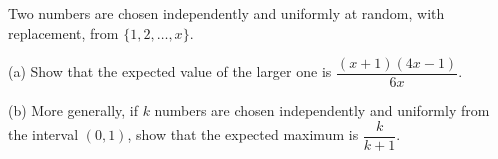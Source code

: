 Two numbers are chosen independently and uniformly at random, with replacement, from $\{1,2,\dots,x\}$.

(a) Show that the expected value of the larger one is $\dfrac{(x+1)(4x-1)}{6x}$.

(b) More generally, if $k$ numbers are chosen independently and uniformly from the interval $(0,1)$, show that the expected maximum is $\dfrac k{k+1}$.
